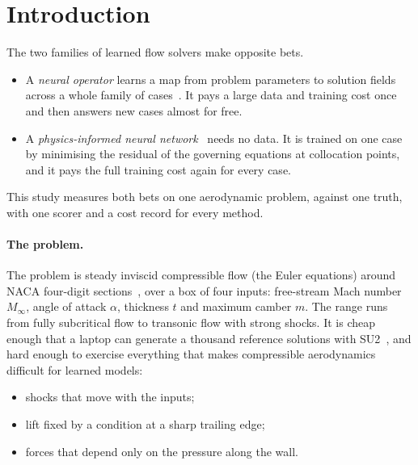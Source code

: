 \documentclass[11pt]{article}
\newcommand{\Ma}{M_\infty}
\begin{document}
\tableofcontents

\section{Introduction}
\label{sec:intro}

The two families of learned flow solvers make opposite bets.
\begin{itemize}
  \item A \emph{neural operator} learns a map from problem parameters to solution fields across a
    whole family of cases~\cite{li2021fno}. It pays a large data and training cost once and then
    answers new cases almost for free.
  \item A \emph{physics-informed neural network}~\cite{raissi2019pinn} needs no data. It is trained
    on one case by minimising the residual of the governing equations at collocation points, and
    it pays the full training cost again for every case.
\end{itemize}
This study measures both bets on one aerodynamic problem, against one truth, with one scorer and a
cost record for every method.

\paragraph{The problem.}
The problem is steady inviscid compressible flow (the Euler equations) around NACA four-digit
sections~\cite{abbott1959}, over a box of four inputs: free-stream Mach number $\Ma$, angle of
attack $\alpha$, thickness $t$ and maximum camber $m$. The range runs from fully subcritical flow
to transonic flow with strong shocks. It is cheap enough that a laptop can generate a thousand
reference solutions with SU2~\cite{economon2016su2}, and hard enough to exercise everything that
makes compressible aerodynamics difficult for learned models:
\begin{itemize}
  \item shocks that move with the inputs;
  \item lift fixed by a condition at a sharp trailing edge;
  \item forces that depend only on the pressure along the wall.
\end{itemize}
\end{document}

